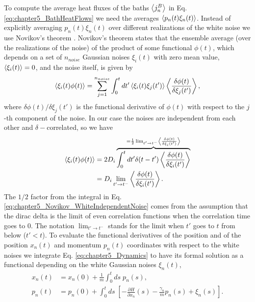 To compute the average heat fluxes of the baths $\expval{j^B_n}$ in Eq. \eqref{eq:chapter5_BathHeatFlows} we need
the averages $\expval{p_n(t)\xi_n(t)}$. Instead of explicitly averaging $p_n(t)\xi_n(t)$ over different realizations of the white noise we use Novikov's theorem \cite{Novikov1965,Ma2011,Toral2014}. Novikov's theorem states that the ensemble average (over  the realizations of the noise) of the product of some functional $\phi(t)$, which depends on a set of
$n_{noise}$ Gaussian noises $\xi_i(t)$ with zero mean value, $\expval{\xi_i(t)} = 0$, and the noise itself, is given by
%
\begin{equation}
    \expval{\xi_i(t)\phi(t)} = \sum_{j=1}^{n_{noise}}\int_0^t dt' \expval{\xi_i(t)\xi_j(t')} \expval{\frac{\delta \phi(t)}{\delta\xi_j(t')}},
    \label{eq:chapter5_Novikov_GeneralExpression}
\end{equation}
%
where ${\delta \phi(t)}/{\delta\xi_j(t')}$ is the functional derivative of $\phi(t)$ with respect to the $j$-th component of the noise. In our case the noises are independent from each other and $\delta-$correlated, so we have
%
\begin{equation}
  \begin{split}
    \expval{\xi_i(t)\phi(t)} &= 2D_i \overbrace{\int_0^t dt' \delta(t-t') \expval{\frac{\delta \phi(t)}{\delta\xi_i(t')}}}^{= \frac{1}{2} \lim_{t'\to t^-} \expval{\frac{\delta \phi(t)}{\delta\xi_i(t')}} }\\
    &=D_i \lim_{t'\to t^-} \expval{ \frac{\delta \phi(t)}{\delta\xi_i(t')} }.
  \end{split}
  \label{eq:chapter5_Novikov_WhiteIndependentNoise}
\end{equation}
%
The $1/2$ factor from the integral in Eq. \eqref{eq:chapter5_Novikov_WhiteIndependentNoise} comes from the assumption that the dirac delta is the limit of even correlation functions when the correlation time goes to 0. The notation $\lim_{t'\to t^-}$ stands for the limit when $t'$ goes to $t$ from below ($t'<t$). To evaluate the functional derivatives of the position and of the position $x_n(t)$ and momentum $p_n(t)$ coordinates with respect to the white noises we integrate Eq. \eqref{eq:chapter5_Dynamics} to have its formal solution as a functional depending on the white Gaussian noises $\xi_n(t)$,
%
\begin{equation}
    \begin{split}
        x_n(t) &= x_n(0) +  \frac{1}{m}\int_0^t ds\; p_n(s) ,\\
        p_n(t) &= p_n(0) + \int_0^t ds\; \left[ -\frac{\partial H}{\partial x_n}(s) - \frac{\gamma_n}{m}p_n(s) + \xi_n(s)\right].
    \end{split}
    \label{eq:chapter5_FormalSolution}
\end{equation}
